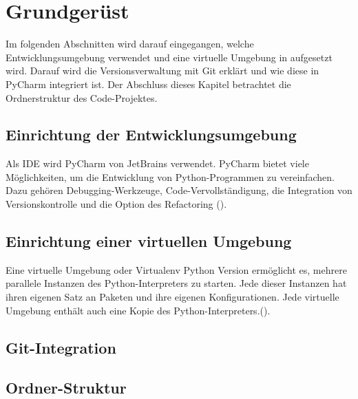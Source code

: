 
\chapter{Grundgerüst}
Im folgenden Abschnitten wird darauf eingegangen, welche Entwicklungsumgebung verwendet und eine virtuelle Umgebung in aufgesetzt wird. Darauf
wird die Versionsverwaltung mit Git erklärt und wie diese in PyCharm integriert ist. Der Abschluss dieses Kapitel
betrachtet die Ordnerstruktur des Code-Projektes.

\section{Einrichtung der Entwicklungsumgebung}
Als \acf{IDE} wird PyCharm von JetBrains verwendet. PyCharm bietet viele Möglichkeiten, um die Entwicklung
von Python-Programmen zu vereinfachen. Dazu gehören Debugging-Werkzeuge, Code-Vervollständigung, die Integration von Versionskontrolle
und die Option des Refactoring (\cite{pyCharmGettingStarted}).

\section{Einrichtung einer virtuellen Umgebung}
\glqq Eine virtuelle Umgebung oder Virtualenv Python Version ermöglicht es, mehrere parallele Instanzen
 des Python-Interpreters zu starten. Jede dieser Instanzen hat ihren 
 eigenen Satz an Paketen und ihre eigenen Konfigurationen. 
 Jede virtuelle Umgebung enthält auch eine Kopie des Python-Interpreters.\grqq (\cite{team_virtualenv_2023}).

\section{Git-Integration}

\section{Ordner-Struktur}